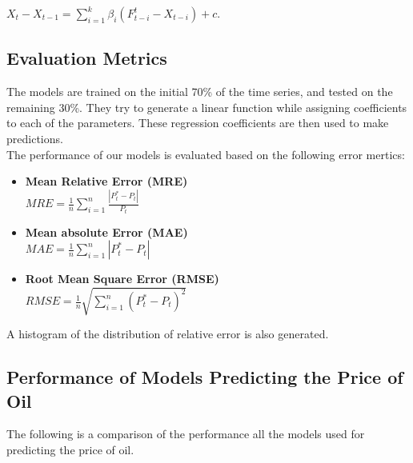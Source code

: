 \documentclass[runningheads]{llncs}
\begin{document}
$X_t - X_{t-1} = \sum\limits_{i=1}^k \beta_i(F_{t-i}^t - X_{t-i}) +c$.


\subsection{Evaluation Metrics}

\noindent The models are trained on the initial 70\% of the time series, and tested on the remaining 30\%. They try to generate a linear function while assigning coefficients to each of the parameters. These regression coefficients are then used to make predictions. \\

The performance of our models is evaluated based on the following error mertics:

\begin {itemize}

\item \textbf{Mean Relative Error (MRE)}\\
$MRE = \frac{1}{n}\sum\limits_{i=1}^n \frac{|P^*_{t} - P_{t}|}{P_t}$\\

\item \textbf{Mean absolute Error (MAE)}\\
$MAE = \frac{1}{n}\sum\limits_{i=1}^n |P^*_{t} - P_{t}|$\\

\item \textbf{Root Mean Square Error (RMSE)}\\
$RMSE = \frac{1}{n}\sqrt{\sum\limits_{i=1}^n (P^*_{t} - P_{t})^2}$\\

\end {itemize}

A histogram of the distribution of relative error is also generated.

\subsection{Performance of Models Predicting the Price of Oil}

\noindent The following is a comparison of the performance all the models used for predicting the price of oil.
\end{document}

